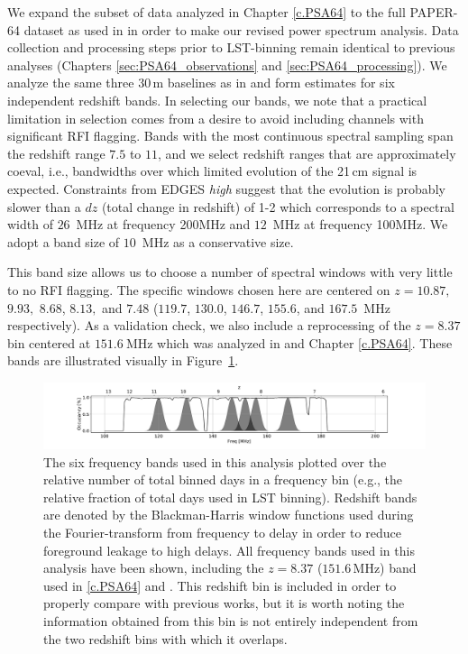 We expand the subset of data analyzed in Chapter \ref{c.PSA64} to the full PAPER-64 dataset as used in  in order to make our revised power spectrum analysis. Data collection and processing steps prior to LST-binning remain identical to previous analyses (Chapters \ref{sec:PSA64_observations} and \ref{sec:PSA64_processing}). We analyze the same three 30\,m baselines as in  and form estimates for six independent redshift bands. In selecting our bands, we note that a practical limitation in selection
comes from a desire to avoid including channels with significant RFI flagging.
Bands with the most continuous spectral sampling span the redshift range $7.5$ to $11$, and we select redshift ranges that are approximately coeval, i.e., bandwidths over which limited evolution of the 21\,cm signal is expected.
Constraints from EDGES \emph{high} suggest that the evolution is probably slower than a $dz$ (total change in
redshift) of 1-2 \citep{monsalve_et_al2017} 
which corresponds to a spectral width of $ 26 $~MHz at frequency 200MHz and 
$12$~MHz at frequency 100MHz.  We adopt a band size of $10$~MHz as a conservative size.

This band size allows us to choose a number of spectral windows with very little to no RFI flagging.  The specific windows chosen here are centered on
$z=10.87,$ $9.93,$ $8.68$, $8.13,$ and $7.48$ ($119.7$, $130.0$, $146.7$, $155.6$, and $167.5$~MHz respectively).
As a validation check, we also include
a reprocessing of the $z=8.37$ bin centered at $151.6~$MHz
which was analyzed in  and Chapter \ref{c.PSA64}.
These bands are illustrated visually in Figure~\ref{fig:freq_select}.

\begin{figure}[t]
\centering
\includegraphics[trim={4cm 0  5cm 0},width=\textwidth]{plots/freq_select_BH.pdf}
\caption{The six frequency bands used in this analysis plotted over the relative number of total binned days in a frequency bin (e.g., the relative fraction of total days used in LST binning).
Redshift bands are denoted by the
Blackman-Harris window functions used during
the Fourier-transform from frequency to delay in order
to reduce foreground leakage to high delays.
All frequency bands used in this analysis have been shown, including the $z=8.37$ ($151.6$\,MHz) band used in \ref{c.PSA64} and \citet{ali_et_al2015}.
This redshift bin is included in order
to properly compare with previous works,
but it is worth noting the information
obtained from this bin is not entirely independent from the two
redshift bins with which it overlaps.
\label{fig:freq_select}}
\end{figure}

